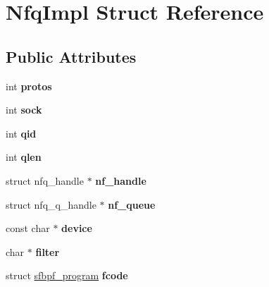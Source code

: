 \hypertarget{struct_nfq_impl}{
\section{NfqImpl Struct Reference}
\label{struct_nfq_impl}
}
\subsection*{Public Attributes}
\begin{DoxyCompactItemize}
\item 
\hypertarget{struct_nfq_impl_a64c36ce21a8e5735dac3e5a1d48f2b5d}{
int {\bfseries protos}}
\label{struct_nfq_impl_a64c36ce21a8e5735dac3e5a1d48f2b5d}

\item 
\hypertarget{struct_nfq_impl_ad4f62082389951ea2ade2f82c76b0d3d}{
int {\bfseries sock}}
\label{struct_nfq_impl_ad4f62082389951ea2ade2f82c76b0d3d}

\item 
\hypertarget{struct_nfq_impl_ab62a7ae465d7c101c05097d8a81a501f}{
int {\bfseries qid}}
\label{struct_nfq_impl_ab62a7ae465d7c101c05097d8a81a501f}

\item 
\hypertarget{struct_nfq_impl_a0baa935f7394eba5af98056162e97e80}{
int {\bfseries qlen}}
\label{struct_nfq_impl_a0baa935f7394eba5af98056162e97e80}

\item 
\hypertarget{struct_nfq_impl_a3caf3b8bef7912a790879e50c31b554d}{
struct nfq\_\-handle $\ast$ {\bfseries nf\_\-handle}}
\label{struct_nfq_impl_a3caf3b8bef7912a790879e50c31b554d}

\item 
\hypertarget{struct_nfq_impl_aff86aea8b42feba95f0eced46a8fe949}{
struct nfq\_\-q\_\-handle $\ast$ {\bfseries nf\_\-queue}}
\label{struct_nfq_impl_aff86aea8b42feba95f0eced46a8fe949}

\item 
\hypertarget{struct_nfq_impl_a65e7761115c92077c4d73668b4c1b70e}{
const char $\ast$ {\bfseries device}}
\label{struct_nfq_impl_a65e7761115c92077c4d73668b4c1b70e}

\item 
\hypertarget{struct_nfq_impl_a7196a80ec7d7ffd0db294ac43b8a937e}{
char $\ast$ {\bfseries filter}}
\label{struct_nfq_impl_a7196a80ec7d7ffd0db294ac43b8a937e}

\item 
\hypertarget{struct_nfq_impl_a52bd9afcebd5cd1750f7de582dfb0450}{
struct \hyperlink{structsfbpf__program}{sfbpf\_\-program} {\bfseries fcode}}
\label{struct_nfq_impl_a52bd9afcebd5cd1750f7de582dfb0450}


\end{DoxyCompactItemize}
